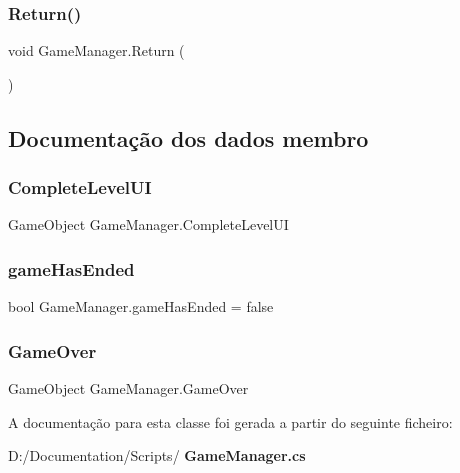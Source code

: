 \subsubsection{Return()}
{\footnotesize\ttfamily void Game\+Manager.\+Return (\begin{DoxyParamCaption}{ }\end{DoxyParamCaption})}



\subsection{Documentação dos dados membro}
\mbox{\label{class_game_manager_acaaaf2a288f9560a1ccef556e3109ac6}} 
\subsubsection{CompleteLevelUI}
{\footnotesize\ttfamily Game\+Object Game\+Manager.\+Complete\+Level\+UI}

\mbox{\label{class_game_manager_a7b12e948c6f64f5456f56d11a67b2f29}} 
\subsubsection{gameHasEnded}
{\footnotesize\ttfamily bool Game\+Manager.\+game\+Has\+Ended = false}

\mbox{\label{class_game_manager_ab62b6e8da08548c01ffd606c47a5e5c7}} 
\subsubsection{GameOver}
{\footnotesize\ttfamily Game\+Object Game\+Manager.\+Game\+Over}



A documentação para esta classe foi gerada a partir do seguinte ficheiro\+:\begin{DoxyCompactItemize}
\item 
D\+:/\+Documentation/\+Scripts/\textbf{ Game\+Manager.\+cs}\end{DoxyCompactItemize}
